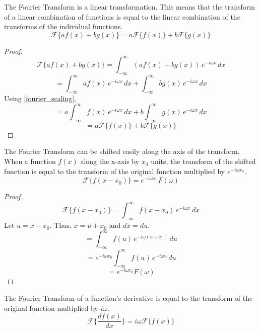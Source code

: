 
\begin{theorem}
    \label{fourier_linearity}
    The Fourier Transform is a linear transformation. This means that the transform of a linear combination of functions is equal to the linear combination of the transforms of the individual functions.
    \begin{equation}
        \mathcal{F}\{ a f(x) + b g(x) \} = a \mathcal{F}\{ f(x) \} + b \mathcal{F}\{ g(x) \}
    \end{equation}
\end{theorem}
\begin{proof}
    \[ \mathcal{F}\{ a f(x) + b g(x) \} = \int_{-\infty}^{\infty} (a f(x) + b g(x)) \, e^{-i \omega x} \,dx \]
    \[ = \int_{-\infty}^{\infty} a f(x) \, e^{-i \omega x} \,dx + \int_{-\infty}^{\infty} b g(x) \, e^{-i \omega x} \,dx \]
    Using \cref{fourier_scaling},
    \[ = a \int_{-\infty}^{\infty} f(x) \, e^{-i \omega x} \,dx + b \int_{-\infty}^{\infty} g(x) \, e^{-i \omega x} \,dx \]
    \[ = a \mathcal{F}\{ f(x) \} + b \mathcal{F}\{ g(x) \} \]
\end{proof}


\begin{theorem}
    \label{fourier_shift}
    The Fourier Transform can be shifted easily along the axis of the transform. When a function \(f(x)\) along the x-axis by \(x_0\) units, the transform of the shifted function is equal to the transform of the original function multiplied by $e^{-i \omega x_0}$.
    \begin{equation}
        \mathcal{F}\{ f(x - x_0) \} = e^{-i \omega x_0} F(\omega)
    \end{equation}
\end{theorem}

\begin{proof}
    \[ \mathcal{F}\{ f(x - x_0) \} = \int_{-\infty}^{\infty} f(x - x_0) \, e^{-i \omega x} \,dx \]
    Let \(u = x - x_0\). Thus, \(x = u + x_0\) and \(dx = du\).
    \[ = \int_{-\infty}^{\infty} f(u) \, e^{-i \omega (u + x_0)} \,du \]
    \[ = e^{-i \omega x_0} \int_{-\infty}^{\infty} f(u) \, e^{-i \omega u} \,du \]
    \[ = e^{-i \omega x_0} F(\omega) \]
\end{proof}

\begin{theorem}
    \label{fourier_derivative}
    The Fourier Transform of a function's derivative is equal to the transform of the original function multiplied by $i \omega$.
    \begin{equation}
        \mathcal{F}\{ \frac{d f(x)}{dx} \} = i \omega \mathcal{F}\{ f(x) \}
    \end{equation}
\end{theorem}

